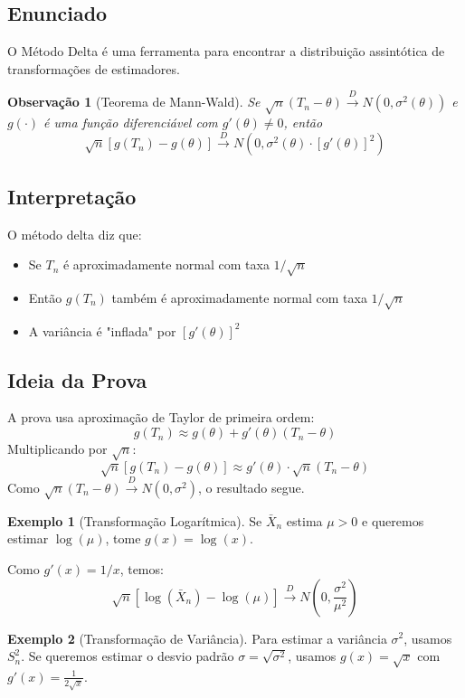 \documentclass[12pt,a4paper]{article}
\theoremstyle{definition}
\newtheorem{exemplo}{Exemplo}[section]
\theoremstyle{plain}
\newtheorem{observacao}{Observação}[section]
\begin{document}
\subsection{Enunciado}

O Método Delta é uma ferramenta para encontrar a distribuição assintótica de transformações de estimadores.

\begin{observacao}[Teorema de Mann-Wald]
Se $\sqrt{n}(T_n - \theta) \xrightarrow{D} N(0, \sigma^2(\theta))$ e $g(\cdot)$ é uma função diferenciável com $g'(\theta) \neq 0$, então
\[
\sqrt{n}\left[g(T_n) - g(\theta)\right] \xrightarrow{D} N\left(0, \sigma^2(\theta) \cdot [g'(\theta)]^2\right)
\]
\end{observacao}

\subsection{Interpretação}

O método delta diz que:
\begin{itemize}
    \item Se $T_n$ é aproximadamente normal com taxa $1/\sqrt{n}$
    \item Então $g(T_n)$ também é aproximadamente normal com taxa $1/\sqrt{n}$
    \item A variância é "inflada" por $[g'(\theta)]^2$
\end{itemize}

\subsection{Ideia da Prova}

A prova usa aproximação de Taylor de primeira ordem:
\[
g(T_n) \approx g(\theta) + g'(\theta)(T_n - \theta)
\]
Multiplicando por $\sqrt{n}$:
\[
\sqrt{n}[g(T_n) - g(\theta)] \approx g'(\theta) \cdot \sqrt{n}(T_n - \theta)
\]
Como $\sqrt{n}(T_n - \theta) \xrightarrow{D} N(0, \sigma^2)$, o resultado segue.

\begin{exemplo}[Transformação Logarítmica]
Se $\bar{X}_n$ estima $\mu > 0$ e queremos estimar $\log(\mu)$, tome $g(x) = \log(x)$.

Como $g'(x) = 1/x$, temos:
\[
\sqrt{n}\left[\log(\bar{X}_n) - \log(\mu)\right] \xrightarrow{D} N\left(0, \frac{\sigma^2}{\mu^2}\right)
\]
\end{exemplo}

\begin{exemplo}[Transformação de Variância]
Para estimar a variância $\sigma^2$, usamos $S_n^2$. Se queremos estimar o desvio padrão $\sigma = \sqrt{\sigma^2}$, usamos $g(x) = \sqrt{x}$ com $g'(x) = \frac{1}{2\sqrt{x}}$.
\end{exemplo}
\end{document}
